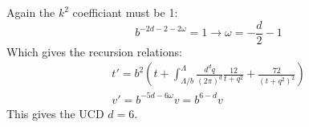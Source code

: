 \documentclass{article}
\begin{document}
Again the $k^2$ coefficiant must be 1:
\begin{equation}
    b^{-2d-2-2\omega} = 1 \rightarrow \omega = -\frac{d}{2} - 1
\end{equation}
Which gives the recursion relations:
\begin{equation}
\begin{gathered}
    t' = b^2\left(t + \int_{\Lambda/b}^\Lambda \frac{d^dq}{(2\pi)^d} \frac{ 12}{t + q^2} + \frac{72}{\left(t + q^2\right)^2}\right)
    \\
    v' = b^{-5d - 6\omega}v = b^{6 - d}v
\end{gathered}
\end{equation}
This gives the UCD $d = 6$.
\end{document}
